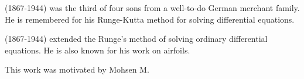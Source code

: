 \documentclass[11pt]{article}
\begin{document}
\textbf{}%
 (1867-1944)
was the third of four sons from a well-to-do German merchant family.  He
is remembered for his \textsf{Runge-Kutta} method for solving
differential equations.

\textbf{}%
 (1867-1944)
extended the Runge's method of solving ordinary differential equations. He
is also known for his work on airfoils.


\begin{flushright}
This work was  motivated by Mohsen M.
\end{flushright}
\end{document}
